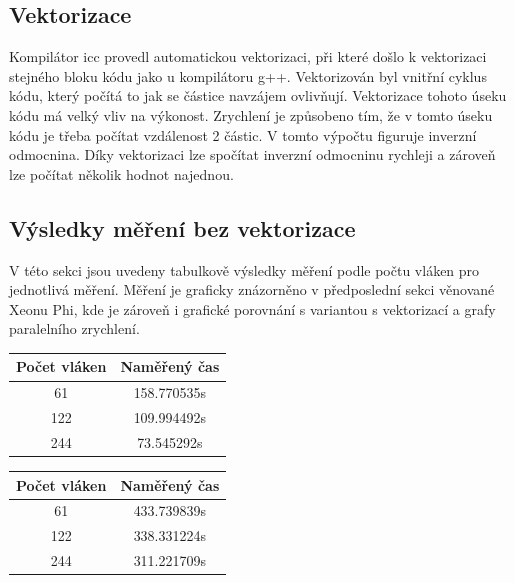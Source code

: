 \documentclass[12pt]{article}
\begin{document}
\subsection{Vektorizace}

Kompilátor icc provedl automatickou vektorizaci, při které došlo k vektorizaci stejného bloku kódu jako u kompilátoru g++. Vektorizován byl vnitřní cyklus kódu, který počítá to jak se částice navzájem ovlivňují. Vektorizace tohoto úseku kódu má velký vliv na výkonost. Zrychlení je způsobeno tím, že v tomto úseku kódu je třeba počítat vzdálenost 2 částic. V tomto výpočtu figuruje inverzní odmocnina. Díky vektorizaci lze spočítat inverzní odmocninu rychleji a zároveň  lze počítat několik hodnot najednou.

\subsection{Výsledky měření bez vektorizace}
V této sekci jsou uvedeny tabulkově výsledky měření podle počtu vláken pro jednotlivá měření.
Měření je graficky znázorněno v předposlední sekci věnované Xeonu Phi, kde je zároveň i grafické porovnání s variantou s vektorizací a grafy paralelního zrychlení.
\begin{table}[H]
\parbox{.45\linewidth}{
%
%
\begin{center}
\begin{tabular}{ c | c }
\textbf{Počet vláken} & \textbf{Naměřený čas} \\ \hline \hline 
61 & 158.770535s \\ \hline
122 & 109.994492s \\ \hline
244 & 73.545292s \\ \hline
\end{tabular}
\end{center}
}
\hfill
\parbox{.45\linewidth}{
%
%
\begin{center}
\begin{tabular}{ c | c }
\textbf{Počet vláken} & \textbf{Naměřený čas} \\ \hline \hline 
61 & 433.739839s \\ \hline
122 & 338.331224s \\ \hline
244 & 311.221709s \\ \hline
\end{tabular}
\end{center}
}
\end{table}
\end{document}

